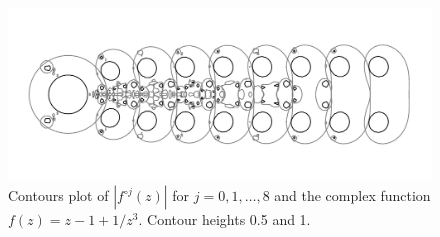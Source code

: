 \documentclass[12pt, a4paper]{amsart}
\begin{document}


\vfill
\pagebreak
\begin{figure}[!ht]
\includegraphics[width=230mm, angle=-90]{caterpillar.pdf}
\caption{
Contours plot of $|f^{\circ j}(z)|$ for $j = 0, 1, \ldots, 8$ and the complex function $f(z) = z - 1 + 1/z^3$.
Contour heights 0.5 and 1.
}
\end{figure}
\pagebreak
\end{document}
